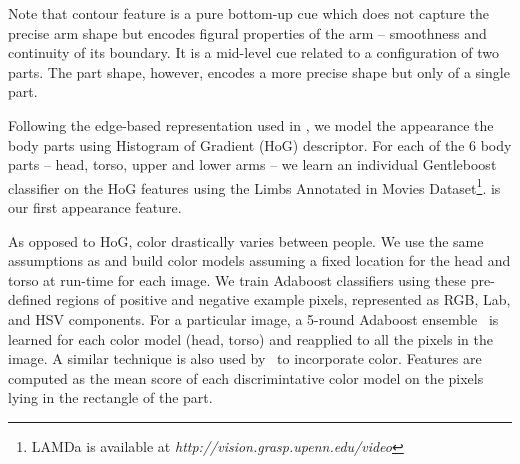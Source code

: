  Note that contour feature is a pure bottom-up cue which does not capture the 
precise arm shape but encodes figural properties of the arm -- smoothness and 
continuity of its boundary. It is a mid-level cue related to a configuration of 
two parts. The part shape, however, encodes a more precise shape but only of a 
single part.
 
 Following the edge-based representation used in 
\cite{latentsvm}, we model the appearance the body parts using Histogram of 
Gradient (HoG) descriptor.  For each of the 6 body parts -- head, torso, upper 
and lower arms -- we learn an individual Gentleboost classifier 
\cite{friedman00} on the HoG features using the Limbs Annotated in Movies 
Dataset\footnote{LAMDa is available at 
\textit{http://vision.grasp.upenn.edu/video}}.  %
is our first appearance feature.

  As opposed to HoG, color drastically varies between people. We use the same assumptions as \cite{eichner09} and build color models assuming a fixed location for the head and torso at run-time for each image.  We train Adaboost classifiers using these pre-defined regions of positive and negative example pixels, represented as RGB, Lab, and HSV components.  For a particular image, a 5-round Adaboost ensemble~\cite{freund1997decision} is learned for each color model (head, torso) and reapplied to all the pixels in the image.  A similar technique is also used by~\cite{strikeapose} to incorporate color.  
Features are computed as the mean score of each discrimintative color model on the pixels lying in the rectangle of the part.


